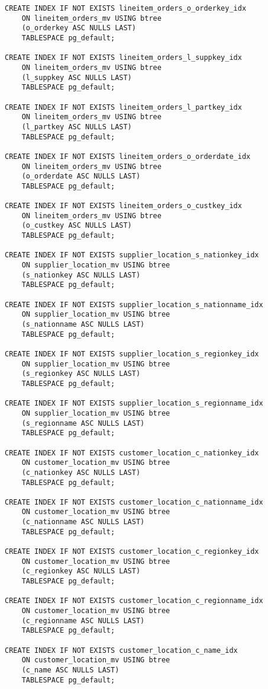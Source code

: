 \begin{lstlisting}
CREATE INDEX IF NOT EXISTS lineitem_orders_o_orderkey_idx
    ON lineitem_orders_mv USING btree
    (o_orderkey ASC NULLS LAST)
    TABLESPACE pg_default;

CREATE INDEX IF NOT EXISTS lineitem_orders_l_suppkey_idx
    ON lineitem_orders_mv USING btree
    (l_suppkey ASC NULLS LAST)
    TABLESPACE pg_default;
	
CREATE INDEX IF NOT EXISTS lineitem_orders_l_partkey_idx
    ON lineitem_orders_mv USING btree
    (l_partkey ASC NULLS LAST)
    TABLESPACE pg_default;

CREATE INDEX IF NOT EXISTS lineitem_orders_o_orderdate_idx
    ON lineitem_orders_mv USING btree
    (o_orderdate ASC NULLS LAST)
    TABLESPACE pg_default;

CREATE INDEX IF NOT EXISTS lineitem_orders_o_custkey_idx
    ON lineitem_orders_mv USING btree
    (o_custkey ASC NULLS LAST)
    TABLESPACE pg_default;

CREATE INDEX IF NOT EXISTS supplier_location_s_nationkey_idx
	ON supplier_location_mv USING btree
	(s_nationkey ASC NULLS LAST)
	TABLESPACE pg_default;

CREATE INDEX IF NOT EXISTS supplier_location_s_nationname_idx
	ON supplier_location_mv USING btree
	(s_nationname ASC NULLS LAST)
	TABLESPACE pg_default;

CREATE INDEX IF NOT EXISTS supplier_location_s_regionkey_idx
	ON supplier_location_mv USING btree
	(s_regionkey ASC NULLS LAST)
	TABLESPACE pg_default;

CREATE INDEX IF NOT EXISTS supplier_location_s_regionname_idx
	ON supplier_location_mv USING btree
	(s_regionname ASC NULLS LAST)
	TABLESPACE pg_default;

CREATE INDEX IF NOT EXISTS customer_location_c_nationkey_idx
	ON customer_location_mv USING btree
	(c_nationkey ASC NULLS LAST)
	TABLESPACE pg_default;

CREATE INDEX IF NOT EXISTS customer_location_c_nationname_idx
	ON customer_location_mv USING btree
	(c_nationname ASC NULLS LAST)
	TABLESPACE pg_default;

CREATE INDEX IF NOT EXISTS customer_location_c_regionkey_idx
	ON customer_location_mv USING btree
	(c_regionkey ASC NULLS LAST)
	TABLESPACE pg_default;

CREATE INDEX IF NOT EXISTS customer_location_c_regionname_idx
	ON customer_location_mv USING btree
	(c_regionname ASC NULLS LAST)
	TABLESPACE pg_default;

CREATE INDEX IF NOT EXISTS customer_location_c_name_idx
	ON customer_location_mv USING btree
	(c_name ASC NULLS LAST)
	TABLESPACE pg_default;

\end{lstlisting}

